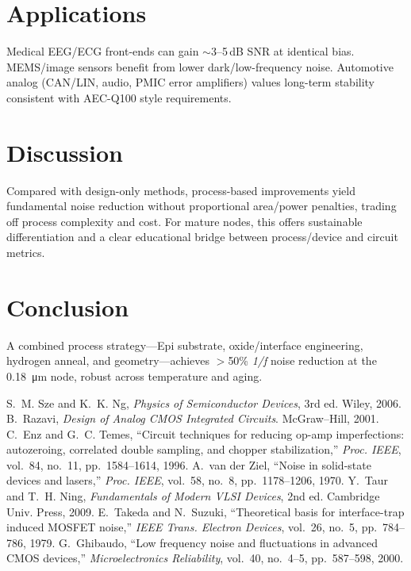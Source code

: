 \documentclass[conference]{IEEEtran}
\begin{document}
\section{Applications}
Medical EEG/ECG front-ends can gain $\sim$3--5\,dB SNR at identical bias.
MEMS/image sensors benefit from lower dark/low-frequency noise.
Automotive analog (CAN/LIN, audio, PMIC error amplifiers) values long-term stability consistent with AEC-Q100 style requirements.

\section{Discussion}
Compared with design-only methods, process-based improvements yield fundamental noise reduction without proportional area/power penalties, trading off process complexity and cost. For mature nodes, this offers sustainable differentiation and a clear educational bridge between process/device and circuit metrics.

\section{Conclusion}
A combined process strategy---Epi substrate, oxide/interface engineering, hydrogen anneal, and geometry---achieves $>$50\% \emph{1/f} noise reduction at the \SI{0.18}{\micro\meter} node, robust across temperature and aging.

\begin{thebibliography}{10}
S.~M. Sze and K.~K. Ng, \emph{Physics of Semiconductor Devices}, 3rd ed. Wiley, 2006.
B.~Razavi, \emph{Design of Analog CMOS Integrated Circuits}. McGraw--Hill, 2001.
C.~Enz and G.~C. Temes, ``Circuit techniques for reducing op-amp imperfections: autozeroing, correlated double sampling, and chopper stabilization,'' \emph{Proc. IEEE}, vol.~84, no.~11, pp.~1584--1614, 1996.
A.~van der Ziel, ``Noise in solid-state devices and lasers,'' \emph{Proc. IEEE}, vol.~58, no.~8, pp.~1178--1206, 1970.
Y.~Taur and T.~H. Ning, \emph{Fundamentals of Modern VLSI Devices}, 2nd ed. Cambridge Univ. Press, 2009.
E.~Takeda and N.~Suzuki, ``Theoretical basis for interface-trap induced MOSFET noise,'' \emph{IEEE Trans. Electron Devices}, vol.~26, no.~5, pp.~784--786, 1979.
G.~Ghibaudo, ``Low frequency noise and fluctuations in advanced CMOS devices,'' \emph{Microelectronics Reliability}, vol.~40, no.~4--5, pp.~587--598, 2000.
\end{thebibliography}
\end{document}
